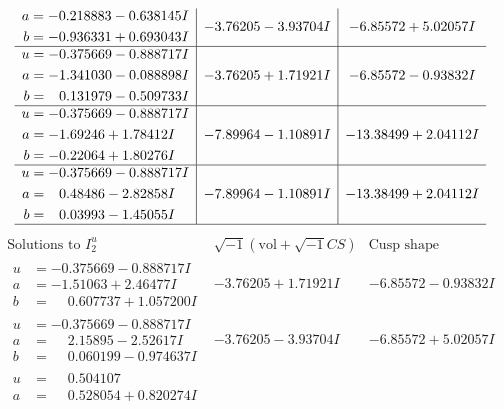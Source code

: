 \documentclass[1p]{elsarticle_modified}
\theoremstyle{definition}
\newcommand{\I}{\sqrt{-1}}
\begin{document}
$$\begin{array}{c|c|c}
\begin{aligned}
a &= -0.218883 - 0.638145 I \\
b &= -0.936331 + 0.693043 I\end{aligned}
 & -3.76205 - 3.93704 I & -6.85572 + 5.02057 I \\ \hline\begin{aligned}
u &= -0.375669 - 0.888717 I \\
a &= -1.341030 - 0.088898 I \\
b &= \phantom{-}0.131979 - 0.509733 I\end{aligned}
 & -3.76205 + 1.71921 I & -6.85572 - 0.93832 I \\ \hline\begin{aligned}
u &= -0.375669 - 0.888717 I \\
a &= -1.69246 + 1.78412 I \\
b &= -0.22064 + 1.80276 I\end{aligned}
 & -7.89964 - 1.10891 I & -13.38499 + 2.04112 I \\ \hline\begin{aligned}
u &= -0.375669 - 0.888717 I \\
a &= \phantom{-}0.48486 - 2.82858 I \\
b &= \phantom{-}0.03993 - 1.45055 I\end{aligned}
 & -7.89964 - 1.10891 I & -13.38499 + 2.04112 I\\
 \hline 
 \end{array}$$\newpage$$\begin{array}{c|c|c}  
\text{Solutions to }I^u_{2}& \I (\text{vol} + \sqrt{-1}CS) & \text{Cusp shape}\\
 \hline 
\begin{aligned}
u &= -0.375669 - 0.888717 I \\
a &= -1.51063 + 2.46477 I \\
b &= \phantom{-}0.607737 + 1.057200 I\end{aligned}
 & -3.76205 + 1.71921 I & -6.85572 - 0.93832 I \\ \hline\begin{aligned}
u &= -0.375669 - 0.888717 I \\
a &= \phantom{-}2.15895 - 2.52617 I \\
b &= \phantom{-}0.060199 - 0.974637 I\end{aligned}
 & -3.76205 - 3.93704 I & -6.85572 + 5.02057 I \\ \hline\begin{aligned}
u &= \phantom{-}0.504107\phantom{ +0.000000I} \\
a &= \phantom{-}0.528054 + 0.820274 I \\

\end{aligned}
\end{array}$$
\end{document}
